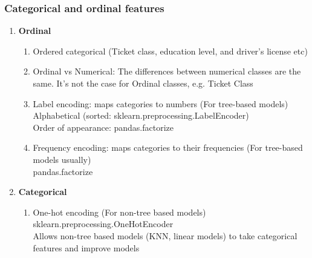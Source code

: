 \documentclass[11pt, twoside]{article}   	%
\begin{document}
\subsubsection{Categorical and ordinal features}
\renewcommand{\labelenumii}{\alph{enumii}}
\begin{enumerate}
  \item \textbf{Ordinal}
    \begin{enumerate}
      \item Ordered categorical (Ticket class, education level, and driver's license etc)
      \item Ordinal vs Numerical: The differences between numerical classes are the same. It's not the case for Ordinal classes, e.g. Ticket Class    
      \item Label encoding: maps categories to numbers (For tree-based models)
        \\\indent Alphabetical (sorted: sklearn.preprocessing.LabelEncoder)
        \\\indent Order of appearance: pandas.factorize
        
      \item Frequency encoding: maps categories to their frequencies (For tree-based models usually)
        \\\indent pandas.factorize     
    \end{enumerate}
  \item \textbf{Categorical}
    \begin{enumerate}
      \item One-hot encoding (For non-tree based models)
        \\\indent sklearn.preprocessing.OneHotEncoder
        \\\indent Allows non-tree based models (KNN, linear models) to take categorical features and improve models        
        \end{enumerate}
  \end{enumerate}

%
\end{document}
